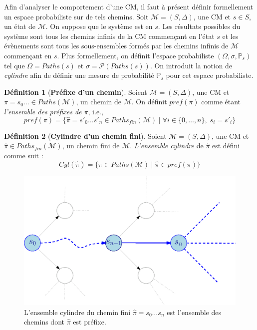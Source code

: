 \documentclass[12pt,a4paper]{report}
\theoremstyle{definition}%
\newtheorem{definition}{Définition}[chapter]
\theoremstyle{remark}
\newcommand{\ie}{i.e., }
\newcommand{\pr}{\mathbb{P}}
\begin{document}
Afin d'analyser le comportement d'une CM, il faut à présent définir formellement un
espace probabiliste sur de tels chemins. Soit $\mathcal{M} = (S, \Delta)$, une CM et
$s \in S$, un état de $\mathcal{M}$. On suppose que le système est en $s$.
Les résultats possibles du système sont tous les chemins infinis de la CM commençant
en l'état $s$ et les évènements sont tous les sous-ensembles formés par les chemins
infinis de $\mathcal{M}$ commençant en $s$. Plus formellement, on définit l'espace
probabiliste $(\Omega, \sigma, \pr_s)$ tel que $\Omega = Paths(s)$ et $\sigma =
\mathcal{P}(Paths(s))$. On introduit la notion de \textit{cylindre} afin de définir
une mesure de probabilité $\pr_s$ pour cet espace probabiliste.

\begin{definition}[\textbf{Préfixe d'un chemin}]
	Soient $\mathcal{M} = (S, \Delta)$, une CM et $\pi = s_0 \dots \in Paths(\mathcal{M})$, un chemin de $\mathcal{M}$. On définit $pref(\pi)$ comme étant \textit{l'ensemble des préfixes de $\pi$}, \ie
	\[ pref(\pi) = \{ \hat{\pi} = s'_0 \dots s'_n \in Paths_{fin}(\mathcal{M}) \; | \; \forall i \in \{0, \dots, n \}, \; s_i = s'_i \} \]
\end{definition}

\begin{definition}[\textbf{Cylindre d'un chemin fini}]
	Soient $\mathcal{M} = (S, \Delta)$, une CM et $\hat{\pi} \in Paths_{fin}(\mathcal{M})$, un chemin fini de $\mathcal{M}$.  \textit{L'ensemble cylindre} de $\hat{\pi}$ est défini comme suit :
	\[ Cyl(\hat{\pi}) = \{\pi \in Paths(\mathcal{M}) \; | \; \hat{\pi} \in pref(\pi) \}\]
\end{definition}

\begin{figure}[h]
	\centering
	\captionsetup{justification=centering}
	\includegraphics[scale=0.7]{figures/cylinder-set.eps}
	\caption{L'ensemble cylindre du chemin fini $\hat{\pi} = s_0 \dots s_n$ est {\color{blue}l'ensemble des chemins} dont $\hat{\pi}$ est préfixe.}
\end{figure}
\end{document}

